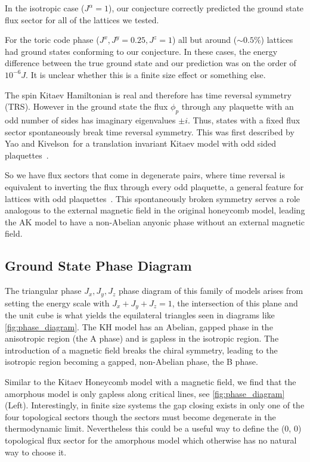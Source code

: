 In the isotropic case (\(J^\alpha = 1\)), our conjecture correctly predicted the ground state flux sector for all of the lattices we tested.

For the toric code phase (\(J^x, J^y = 0.25, J^z = 1\)) all but around (\(\sim 0.5 \%\)) lattices had ground states conforming to our conjecture. In these cases, the energy difference between the true ground state and our prediction was on the order of \(10^{-6} J\). It is unclear whether this is a finite size effect or something else.

The spin Kitaev Hamiltonian is real and therefore has time reversal symmetry (TRS). However in the ground state the flux \(\phi_p\) through any plaquette with an odd number of sides has imaginary eigenvalues \(\pm i\). Thus, states with a fixed flux sector spontaneously break time reversal symmetry. This was first described by Yao and Kivelson~for a translation invariant Kitaev model with odd sided plaquettes~\autocite{Yao2011}.

So we have flux sectors that come in degenerate pairs, where time reversal is equivalent to inverting the flux through every odd plaquette, a general feature for lattices with odd plaquettes~\autocite{yaoExactChiralSpin2007,Peri2020}. This spontaneously broken symmetry serves a role analogous to the external magnetic field in the original honeycomb model, leading the AK model to have a non-Abelian anyonic phase without an external magnetic field.

\hypertarget{ground-state-phase-diagram}{%
\subsection{Ground State Phase Diagram}\label{ground-state-phase-diagram}}

The triangular phase \(J_x, J_y, J_z\) phase diagram of this family of models arises from setting the energy scale with \(J_x + J_y + J_z = 1\), the intersection of this plane and the unit cube is what yields the equilateral triangles seen in diagrams like \cref{fig:phase_diagram}. The KH model has an Abelian, gapped phase in the anisotropic region (the A phase) and is gapless in the isotropic region. The introduction of a magnetic field breaks the chiral symmetry, leading to the isotropic region becoming a gapped, non-Abelian phase, the B phase.

Similar to the Kitaev Honeycomb model with a magnetic field, we find that the amorphous model is only gapless along critical lines, see \cref{fig:phase_diagram} (Left). Interestingly, in finite size systems the gap closing exists in only one of the four topological sectors though the sectors must become degenerate in the thermodynamic limit. Nevertheless this could be a useful way to define the (0, 0) topological flux sector for the amorphous model which otherwise has no natural way to choose it.


